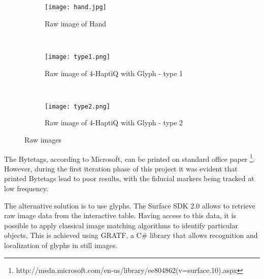 \begin{figure}
        \centering
        \begin{subfigure}[H]{0.3\textwidth}
                \texttt{[image: hand.jpg]}
                \caption{Raw image of Hand}
                \label{fig:rawHand}
        \end{subfigure}%
        ~ %
        \begin{subfigure}[H]{0.3\textwidth}
                \texttt{[image: type1.png]}
                \caption{Raw image of 4-HaptiQ with Glyph - type 1}
                \label{fig:rawHaptiQ1}
        \end{subfigure}
        ~ %
        \begin{subfigure}[H]{0.3\textwidth}
                \texttt{[image: type2.png]}
                \caption{Raw image of 4-HaptiQ with Glyph - type 2}
                \label{fig:rawHaptiQ2}
        \end{subfigure}
        \caption{Raw images}\label{fig:rawImages}
\end{figure}

The Bytetags, according to Microsoft, can be printed on standard office paper \footnote{http://msdn.microsoft.com/en-us/library/ee804862(v=surface.10).aspx}. However, during the first iteration phase of this project it was evident that printed Bytetags lead to poor results, with the fiducial markers being tracked at low frequency.

The alternative solution is to use glyphs. The Surface SDK 2.0 allows to retrieve raw image data from the interactive table. Having access to this data, it is possible to apply classical image matching algorithms to identify particular objects. This is achieved using GRATF, a C\# library that allows recognition and localization of glyphs in still images. 

